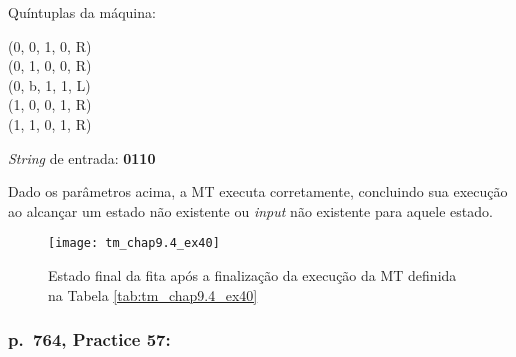 \begin{table}[H]
    \begin{minipage}{0.666\linewidth}

        \begin{minipage}{.5\linewidth}
            Quíntuplas da máquina:
        \end{minipage}%
        \begin{minipage}{.5\linewidth}
            \ttfamily
            (0, 0, 1, 0, R) \\
            (0, 1, 0, 0, R) \\
            (0, b, 1, 1, L) \\
            (1, 0, 0, 1, R) \\
            (1, 1, 0, 1, R)
        \end{minipage}

    \end{minipage}%
    \begin{minipage}{0.333\linewidth}

       \begin{flushright}
            \textit{String} de entrada: \textbf{0110}
       \end{flushright}

    \end{minipage}

    \caption{\cite[p.\ 762, Example 40]{judith}}
    \label{tab:tm_chap9.4_ex40}
\end{table}

Dado os parâmetros acima, a MT executa corretamente, concluindo sua execução ao
alcançar um estado não existente ou \textit{input} não existente para aquele
estado.

\begin{figure}[H]
    \centering
    \texttt{[image: tm\_chap9.4\_ex40]}
    \caption{
        Estado final da fita após a finalização da execução da MT definida na
        Tabela \ref{tab:tm_chap9.4_ex40}
    }
    \label{fig:tm_chap9.4_ex40}
\end{figure}

\subsubsection*{p.\ 764, Practice 57:}

